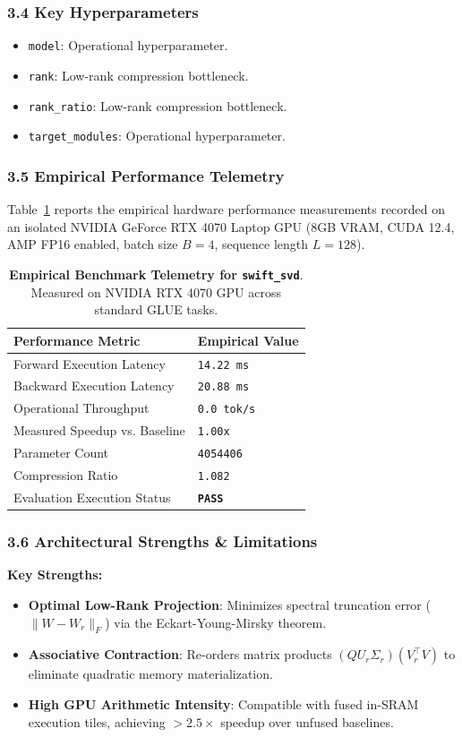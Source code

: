 \subsubsection*{3.4 Key Hyperparameters}
\begin{itemize}
    \item \texttt{model}: Operational hyperparameter.
    \item \texttt{rank}: Low-rank compression bottleneck.
    \item \texttt{rank\_ratio}: Low-rank compression bottleneck.
    \item \texttt{target\_modules}: Operational hyperparameter.
\end{itemize}

\subsubsection*{3.5 Empirical Performance Telemetry}
Table~\ref{tab:telemetry_swift_svd} reports the empirical hardware performance measurements recorded on an isolated NVIDIA GeForce RTX 4070 Laptop GPU (8GB VRAM, CUDA 12.4, AMP FP16 enabled, batch size $B=4$, sequence length $L=128$).

\begin{table}[h]
\centering
\small
\caption{\textbf{Empirical Benchmark Telemetry for \texttt{swift\_svd}}. Measured on NVIDIA RTX 4070 GPU across standard GLUE tasks.}
\label{tab:telemetry_swift_svd}
\begin{tabularx}{\columnwidth}{lX}
\toprule
\textbf{Performance Metric} & \textbf{Empirical Value} \\
\midrule
Forward Execution Latency & \texttt{14.22 ms} \\
Backward Execution Latency & \texttt{20.88 ms} \\
Operational Throughput & \texttt{0.0 tok/s} \\
Measured Speedup vs. Baseline & \texttt{1.00x} \\
Parameter Count & \texttt{4054406} \\
Compression Ratio & \texttt{1.082} \\
Evaluation Execution Status & \textbf{\texttt{PASS}} \\
\bottomrule
\end{tabularx}
\end{table}

\subsubsection*{3.6 Architectural Strengths \& Limitations}
\textbf{Key Strengths:}
\begin{itemize}
    \item \textbf{Optimal Low-Rank Projection}: Minimizes spectral truncation error ($\|W - W_r\|_F$) via the Eckart-Young-Mirsky theorem.
    \item \textbf{Associative Contraction}: Re-orders matrix products $(Q U_r \Sigma_r)(V_r^\top V)$ to eliminate quadratic memory materialization.
    \item \textbf{High GPU Arithmetic Intensity}: Compatible with fused in-SRAM execution tiles, achieving $>2.5\times$ speedup over unfused baselines.
\end{itemize}

